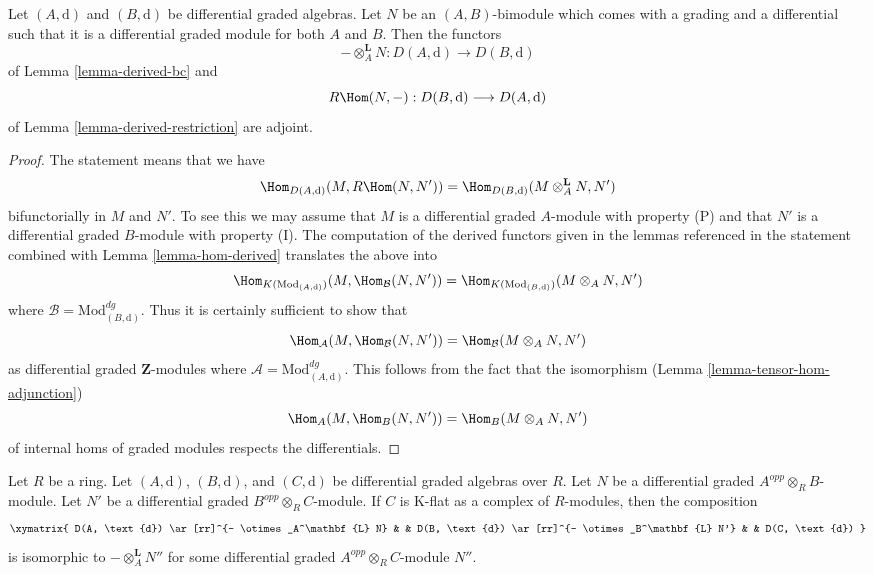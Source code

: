 \begin{lemma}
\label{lemma-tensor-hom-adjoint}
Let $(A, \text{d})$ and $(B, \text{d})$ be differential graded algebras.
Let $N$ be an $(A, B)$-bimodule which comes with a grading and a differential
such that it is a differential graded module for both $A$ and $B$.
Then the functors
$$
- \otimes_A^\mathbf{L} N : D(A, \text{d}) \longrightarrow D(B, \text{d})
$$
of Lemma \ref{lemma-derived-bc} and
$$
R\Hom(N, -) : D(B, \text{d}) \longrightarrow D(A, \text{d})
$$
of Lemma \ref{lemma-derived-restriction} are adjoint.
\end{lemma}

\begin{proof}
The statement means that we have
$$
\Hom_{D(A, \text{d})}(M, R\Hom(N, N')) =
\Hom_{D(B, \text{d})}(M \otimes^\mathbf{L}_A N, N')
$$
bifunctorially in $M$ and $N'$. To see this we may assume that $M$
is a differential graded $A$-module with property (P) and that $N'$
is a differential graded $B$-module with property (I). The computation
of the derived functors given in the lemmas referenced in the statement
combined with Lemma \ref{lemma-hom-derived} translates the above into
$$
\Hom_{K(\text{Mod}_{(A, \text{d})})}(M, \Hom_\mathcal{B}(N, N')) =
\Hom_{K(\text{Mod}_{(B, \text{d})})}(M \otimes_A N, N')
$$
where $\mathcal{B} = \text{Mod}^{dg}_{(B, \text{d})}$. Thus it is certainly
sufficient to show that
$$
\Hom_\mathcal{A}(M, \Hom_\mathcal{B}(N, N')) =
\Hom_\mathcal{B}(M \otimes_A N, N')
$$
as differential graded $\mathbf{Z}$-modules where
$\mathcal{A} = \text{Mod}^{dg}_{(A, \text{d})}$.
This follows from the fact that the isomorphism
(Lemma \ref{lemma-tensor-hom-adjunction})
$$
\Hom_A(M, \Hom_B(N, N')) = \Hom_B(M \otimes_A N, N')
$$
of internal homs of graded modules respects the differentials.
\end{proof}

\begin{lemma}
\label{lemma-compose-tensor-functors}
Let $R$ be a ring. Let $(A, \text{d})$, $(B, \text{d})$, and
$(C, \text{d})$ be  differential graded algebras over $R$.
Let $N$ be a differential graded $A^{opp} \otimes_R B$-module.
Let $N'$ be a differential graded $B^{opp} \otimes_R C$-module.
If $C$ is K-flat as a complex of $R$-modules, then the composition
$$
\xymatrix{
D(A, \text{d}) \ar[rr]^{- \otimes_A^\mathbf{L} N} & &
D(B, \text{d}) \ar[rr]^{- \otimes_B^\mathbf{L} N'} & &
D(C, \text{d})
}
$$
is isomorphic to $- \otimes_A^\mathbf{L} N''$ for some differential graded
$A^{opp} \otimes_R C$-module $N''$.
\end{lemma}

